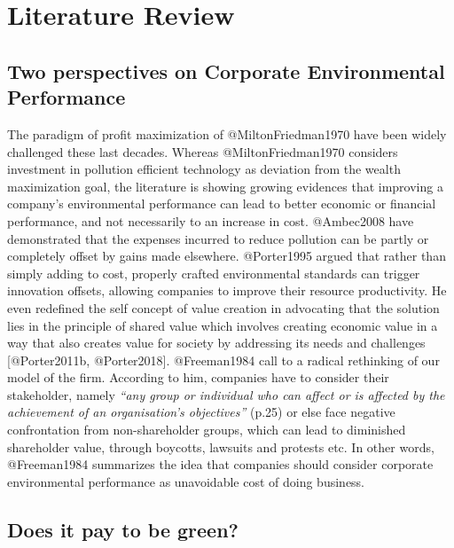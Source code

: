 \documentclass[]{article}
\title{}
\author{}
\date{}
\begin{document}
\section{Literature Review}\label{literature-review}

\subsection{Two perspectives on Corporate Environmental
Performance}\label{two-perspectives-on-corporate-environmental-performance}

The paradigm of profit maximization of @MiltonFriedman1970 have been
widely challenged these last decades. Whereas @MiltonFriedman1970
considers investment in pollution efficient technology as deviation from
the wealth maximization goal, the literature is showing growing
evidences that improving a company's environmental performance can lead
to better economic or financial performance, and not necessarily to an
increase in cost. @Ambec2008 have demonstrated that the expenses
incurred to reduce pollution can be partly or completely offset by gains
made elsewhere. @Porter1995 argued that rather than simply adding to
cost, properly crafted environmental standards can trigger innovation
offsets, allowing companies to improve their resource productivity. He
even redefined the self concept of value creation in advocating that the
solution lies in the principle of shared value which involves creating
economic value in a way that also creates value for society by
addressing its needs and challenges {[}@Porter2011b, @Porter2018{]}.
@Freeman1984 call to a radical rethinking of our model of the firm.
According to him, companies have to consider their stakeholder, namely
\emph{``any group or individual who can affect or is affected by the
achievement of an organisation's objectives''} (p.25) or else face
negative confrontation from non-shareholder groups, which can lead to
diminished shareholder value, through boycotts, lawsuits and protests
etc. In other words, @Freeman1984 summarizes the idea that companies
should consider corporate environmental performance as unavoidable cost
of doing business.

\subsection{Does it pay to be green?}\label{does-it-pay-to-be-green}
\end{document}
